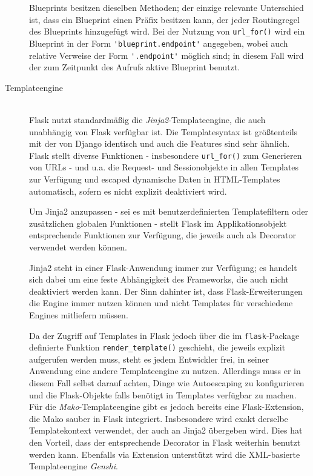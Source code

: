 \begin{description}
Blueprints besitzen dieselben Methoden; der einzige relevante Unterschied ist, dass ein Blueprint
einen Präfix besitzen kann, der jeder Routingregel des Blueprints hinzugefügt wird. Bei der Nutzung
von \lstinline{url_for()} wird ein Blueprint in der Form \lstinline{'blueprint.endpoint'} angegeben,
wobei auch relative Verweise der Form \lstinline{'.endpoint'} möglich sind; in diesem Fall wird der
zum Zeitpunkt des Aufrufs aktive Blueprint benutzt.


\item[Templateengine] \hfill \\
Flask nutzt standardmäßig die \emph{Jinja2}-Templateengine, die auch unabhängig von Flask verfügbar
ist. Die Templatesyntax ist größtenteils mit der von Django identisch und auch die Features sind
sehr ähnlich. Flask stellt diverse Funktionen - insbesondere \lstinline{url_for()} zum Generieren
von URLs - und u.a. die Request- und Sessionobjekte in allen Templates zur Verfügung und escaped
dynamische Daten in HTML-Templates automatisch, sofern es nicht explizit deaktiviert wird.

Um Jinja2 anzupassen - sei es mit benutzerdefinierten Templatefiltern oder zusätzlichen globalen
Funktionen - stellt Flask im Applikationsobjekt entsprechende Funktionen zur Verfügung, die jeweils
auch als Decorator verwendet werden können.

Jinja2 steht in einer Flask-Anwendung immer zur Verfügung; es handelt sich dabei um eine feste
Abhängigkeit des Frameworks, die auch nicht deaktiviert werden kann. Der Sinn dahinter ist, dass
Flask-Erweiterungen die Engine immer nutzen können und nicht Templates für verschiedene Engines
mitliefern müssen.

Da der Zugriff auf Templates in Flask jedoch über die im \lstinline{flask}-Package definierte
Funktion \lstinline{render_template()} geschieht, die jeweils explizit aufgerufen werden muss, steht
es jedem Entwickler frei, in seiner Anwendung eine andere Templateengine zu nutzen. Allerdings muss
er in diesem Fall selbst darauf achten, Dinge wie Autoescaping zu konfigurieren und die
Flask-Objekte falls benötigt in Templates verfügbar zu machen. Für die \emph{Mako}-Templateengine
gibt es jedoch bereits eine Flask-Extension, die Mako sauber in Flask integriert. Insbesondere wird
exakt derselbe Templatekontext verwendet, der auch an Jinja2 übergeben wird. Dies hat den Vorteil,
dass der entsprechende Decorator in Flask weiterhin benutzt werden kann. Ebenfalls via Extension
unterstützt wird die XML-basierte Templateengine \emph{Genshi}.



\end{description}
